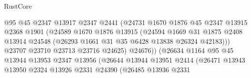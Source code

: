 \begin{lexlean}{RustCore}
\begin{coremodule}
                                        @95
                                        @45
                                        @2347
                                        @13917
                                        @2347
                                        @2441
                                        (@24731
                                          @1670
                                          @1876
                                          @45
                                          @2347
                                          @13915
                                          @2368
                                          @1901
                                          (@24589
                                            @1670
                                            @1876
                                            @13915
                                            (@24594
                                              @1669
                                              @31
                                              @1875
                                              @2408
                                              @13914
                                              @24548
                                              (@26293 @1661 @31 @35 @6428 @13838 @26324 @42183)))
                                          @23707
                                          @23710
                                          @23713
                                          @23716
                                          @24625)
                                        @24676))
                                    (@26634
                                      @1164
                                      @95
                                      @45
                                      @13944
                                      @13953
                                      @2347
                                      @13956
                                      (@26644
                                        @13944
                                        @13951
                                        @2414
                                        (@26471
                                          @13943
                                          @13950
                                          @2324
                                          @13926
                                          @2331
                                          @24390
                                          (@26485
                                            @13936
                                            @2331

\end{coremodule}
\end{lexlean}
